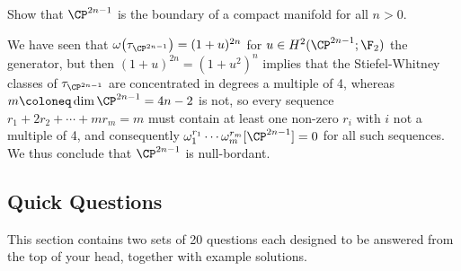 \begin{exercise}
	Show that $\CP^{2n - 1}$ is the boundary of a compact manifold for all $n > 0$.
\end{exercise}
\begin{solution}
	We have seen that $\omega\big(\tau_{\CP^{2n - 1}}\big) = (1 + u)^{2n}$ for $u \in H^2(\CP^{2n - 1}; \F_2)$ the generator, but then $(1 + u)^{2n} = (1 + u^2)^n$ implies that the Stiefel-Whitney classes of $\tau_{\CP^{2n - 1}}$ are concentrated in degrees a multiple of 4, whereas $m \coloneq \dim \CP^{2n - 1} = 4n - 2$ is not, so every sequence $r_1 + 2 r_2 + \cdots + m r_m = m$ must contain at least one non-zero $r_i$ with $i$ not a multiple of 4, and consequently $\omega_1^{r_1} \cdots \omega_m^{r_m}[\CP^{2n - 1}] = 0$ for all such sequences.
	We thus conclude that $\CP^{2n - 1}$ is null-bordant.
\end{solution}

\subsection{Quick Questions}\label{sect:quickquest}
This section contains two sets of 20 questions each designed to be answered from the top of your head, together with example solutions.

